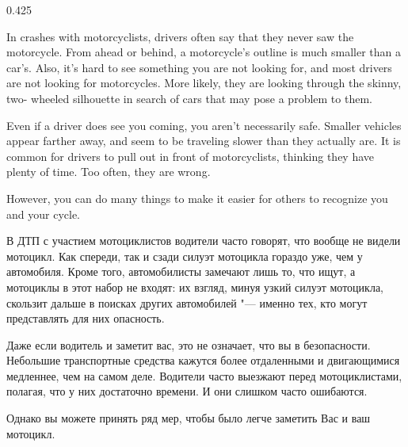 




\begin{langblock}{0.425}
	\begin{eng}
	
	In crashes with motorcyclists, drivers often say that they never saw the motorcycle. From ahead or behind, a motorcycle's outline is much smaller than a car's. Also, it's hard to see something you are not looking for, and most drivers are not looking for motorcycles. More likely, they are looking through the skinny, two- wheeled silhouette in search of cars that may pose a problem to them.
	
	Even if a driver does see you coming, you aren't necessarily safe.  Smaller vehicles appear farther away, and seem to be traveling slower than they actually are. It is common for drivers to pull out in front of motorcyclists, thinking they have plenty of time. Too often, they are wrong.
	
	However, you can do many things to make it easier for others to recognize you and your cycle.
	\end{eng}
	\begin{rus}
		
		В ДТП с участием мотоциклистов водители часто говорят, что вообще не видели мотоцикл. Как спереди, так и сзади силуэт мотоцикла гораздо уже, чем у автомобиля. Кроме того, автомобилисты замечают лишь то, что ищут, а мотоциклы в этот набор не входят: их взгляд, минуя узкий силуэт мотоцикла, скользит дальше в поисках других автомобилей "--- именно тех, кто могут представлять для них опасность.
		
		Даже если водитель и заметит вас, это не означает, что вы в безопасности. Небольшие транспортные средства кажутся более отдаленными и двигающимися медленнее, чем на самом деле. Водители часто выезжают перед мотоциклистами, полагая, что у них достаточно времени. И они слишком часто ошибаются.
		
		Однако вы можете принять ряд мер, чтобы было легче заметить Вас и ваш мотоцикл.
\end{rus}
\end{langblock}





